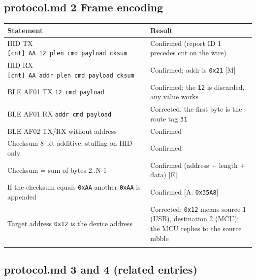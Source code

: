 \subsection{protocol.md 2 Frame
encoding}\label{protocol.md-2-frame-encoding}

{\def\LTcaptype{none} %
\begin{longtable}[]{@{}
  >{\raggedright\arraybackslash}p{}
  >{\raggedright\arraybackslash}p{}@{}}
\toprule\noalign{}
\begin{minipage}[b]{\linewidth}\raggedright
Statement
\end{minipage} & \begin{minipage}[b]{\linewidth}\raggedright
Result
\end{minipage} \\
\midrule\noalign{}
\endhead
\bottomrule\noalign{}
\endlastfoot
HID TX \texttt{{[}cnt{]}\ AA\ 12\ plen\ cmd\ payload\ cksum} & Confirmed
(report ID 1 precedes cnt on the wire) \\
HID RX \texttt{{[}cnt{]}\ AA\ addr\ plen\ cmd\ payload\ cksum} &
Confirmed; addr is \texttt{0x21} {[}M{]} \\
BLE AF01 TX \texttt{12\ cmd\ payload} & Confirmed; the \texttt{12} is
discarded, any value works \\
BLE AF01 RX \texttt{addr\ cmd\ payload} & Corrected: the first byte is
the route tag \texttt{31} \\
BLE AF02 TX/RX without address & Confirmed \\
Checksum 8-bit additive; stuffing on HID only & Confirmed \\
Checksum = sum of bytes 2..N-1 & Confirmed (address + length + data)
{[}E{]} \\
If the checksum equals \texttt{0xAA} another \texttt{0xAA} is appended &
Confirmed {[}A: \texttt{0x35A8}{]} \\
Target address \texttt{0x12} is the device address & Corrected:
\texttt{0x12} means source 1 (USB), destination 2 (MCU); the MCU replies
to the source nibble \\*
\end{longtable}
}

\subsection{protocol.md 3 and 4 (related
entries)}\label{protocol.md-3-and-4-related-entries}

